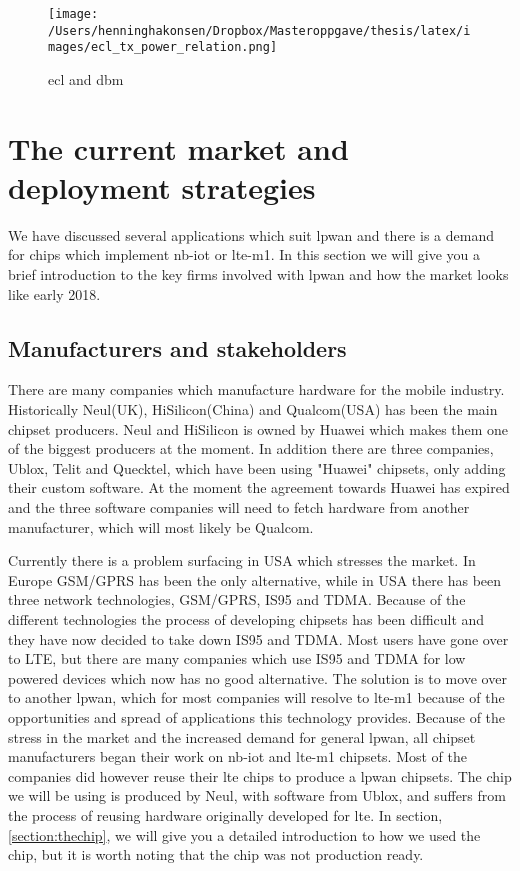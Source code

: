 \documentclass[USenglish]{ifimaster}  %
\begin{document}

\begin{figure}[H]
  \centering\texttt{[image: /Users/henninghakonsen/Dropbox/Masteroppgave/thesis/latex/images/ecl\_tx\_power\_relation.png]}
  \caption{\acrshort{ecl} and \acrshort{dbm}}
  \label{figure:ecl_dbm}
\end{figure}

\section{The current market and deployment strategies} \label{section:market}
We have discussed several applications which suit \acrshort{lpwan} and there is a demand for chips which implement \acrshort{nb-iot} or \acrshort{lte-m1}. In this section we will give you a brief introduction to the key firms involved with \acrshort{lpwan} and how the market looks like early 2018.

\subsection{Manufacturers and stakeholders} \label{ssection:manufacture}
There are many companies which manufacture hardware for the mobile industry. Historically Neul(UK), HiSilicon(China) and Qualcom(USA) has been the main chipset producers. Neul and HiSilicon is owned by Huawei which makes them one of the biggest producers at the moment. In addition there are three companies, Ublox, Telit and Quecktel, which have been using "Huawei" chipsets, only adding their custom software. At the moment the agreement towards Huawei has expired and the three software companies will need to fetch hardware from another manufacturer, which will most likely be Qualcom.

Currently there is a problem surfacing in USA which stresses the market. In Europe GSM/GPRS has been the only alternative, while in USA there has been three network technologies, GSM/GPRS, IS95 and TDMA. Because of the different technologies the process of developing chipsets has been difficult and they have now decided to take down IS95 and TDMA. Most users have gone over to LTE, but there are many companies which use IS95 and TDMA for low powered devices which now has no good alternative. The solution is to move over to another \acrshort{lpwan}, which for most companies will resolve to \acrshort{lte-m1} because of the opportunities and spread of applications this technology provides.
Because of the stress in the market and the increased demand for general \acrshort{lpwan}, all chipset manufacturers began their work on \acrshort{nb-iot} and \acrshort{lte-m1} chipsets. Most of the companies did however reuse their \acrshort{lte} chips to produce a \acrshort{lpwan} chipsets. The chip we will be using is produced by Neul, with software from Ublox, and suffers from the process of reusing hardware originally developed for \acrshort{lte}. In section, \vref{section:thechip}, we will give you a detailed introduction to how we used the chip, but it is worth noting that the chip was not production ready.
\end{document}
